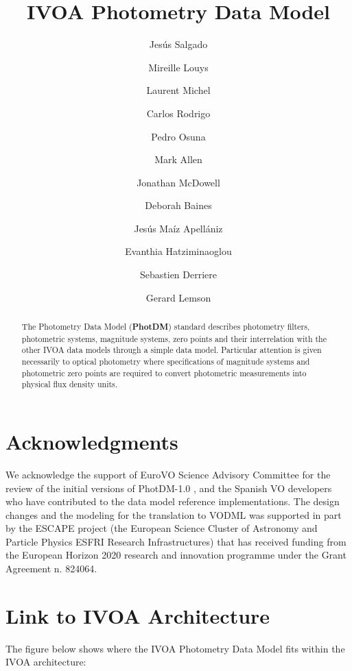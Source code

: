 \documentclass[11pt,a4paper]{ivoa}
\title{IVOA Photometry Data Model}
\author{Jesús Salgado}
\author{Mireille Louys}
\author{Laurent Michel}
\author{Carlos Rodrigo}
\author{Pedro Osuna}
\author{Mark Allen}
\author{Jonathan McDowell}
\author{Deborah Baines}
\author{Jesús Maíz Apellániz}
\author{Evanthia Hatziminaoglou}
\author{Sebastien \mbox{Derriere}}
\author{Gerard Lemson}
\begin{document}
\begin{abstract}
The Photometry Data Model (\textbf{PhotDM}) standard describes photometry
filters, photometric systems, magnitude systems, zero points and their
interrelation with the other IVOA data models through a simple data model.
Particular attention is given necessarily to optical photometry where
specifications of magnitude systems and photometric zero points are required
to convert photometric measurements into physical flux density units.
\end{abstract}

\section*{Acknowledgments}
We acknowledge the support of EuroVO Science Advisory Committee for the review of the
initial versions of PhotDM-1.0 , and the Spanish VO developers who have contributed
to the data model reference implementations.
The design changes and the modeling for the translation to VODML was supported in part by the
ESCAPE project (the European Science Cluster of Astronomy and Particle Physics ESFRI Research Infrastructures)
that has received funding from the European Horizon 2020 research and innovation programme under the Grant Agreement n. 824064.


\pagebreak

\section*{Link to IVOA Architecture}
The figure below shows where the IVOA Photometry Data Model fits within the
IVOA architecture:


\end{document}
